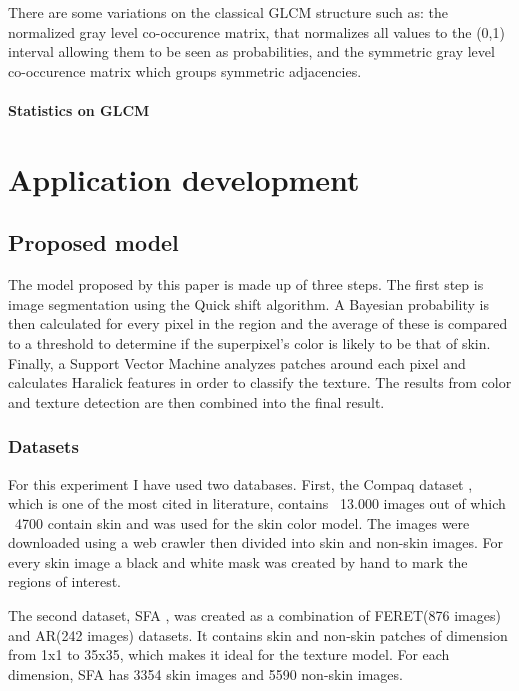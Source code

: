 \documentclass[12pt]{report}
\begin{document}
	There are some variations on the classical GLCM structure such as: the normalized gray level co-occurence matrix, that normalizes all values to the (0,1) interval allowing them to be seen as probabilities, and the symmetric gray level co-occurence matrix which groups symmetric adjacencies.
	
	\subsubsection{Statistics on GLCM}
	
	
	\chapter{Application development}
	
	\section{Proposed model}
	The model proposed by this paper is made up of three steps. The first step is image segmentation using the Quick shift algorithm. A Bayesian probability is then calculated for every pixel in the region and the average of these is compared to a threshold to determine if the superpixel's color is likely to be that of skin. Finally, a Support Vector Machine analyzes patches around each pixel and calculates Haralick features in order to classify the texture. The results from color and texture detection are then combined into the final result.
	
	\subsection{Datasets}
	For this experiment I have used two databases. First, the Compaq dataset \cite{compaq}, which is one of the most cited in literature, contains ~13.000 images out of which ~4700 contain skin and was used for the skin color model. The images were downloaded using a web crawler then divided into skin and non-skin images. For every skin image a black and white mask was created by hand to mark the regions of interest.
	
	The second dataset, SFA \cite{sfa}, was created as a combination of FERET(876 images) and AR(242 images)  datasets. It contains skin and non-skin patches of dimension from 1x1 to 35x35, which makes it ideal for the texture model. For each dimension, SFA has 3354 skin images and 5590 non-skin images.
	
\end{document}
